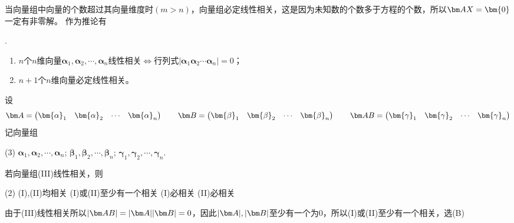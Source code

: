 当向量组中向量的个数超过其向量维度时$(m>n)$，向量组必定线性相关，这是因为未知数的个数多于方程的个数，所以$\mat{AX}=\bm{0}$一定有非零解。
作为推论有
\begin{theorem}
    .
    \begin{enumerate}[(1)]
        \item $n$个$n$维向量$\bm{\alpha}_1,\bm{\alpha}_2,\cdots,\bm{\alpha}_n$线性相关$\iff$行列式$|\bm{\alpha}_1 \bm{\alpha}_2 \cdots \bm{\alpha}_n|=0$；
        \item $n+1$个$n$维向量必定线性相关。
    \end{enumerate}
\end{theorem}
\begin{example}
    设
    \[
        \mat{A} =
        \begin{pmatrix}
            \bm{\alpha}_1 & \bm{\alpha}_2 & \cdots & \bm{\alpha}_n
        \end{pmatrix}
        \qquad
        \mat{B} =
        \begin{pmatrix}
            \bm{\beta}_1 & \bm{\beta}_2 & \cdots & \bm{\beta}_n
        \end{pmatrix}
        \qquad
        \mat{AB} =
        \begin{pmatrix}
            \bm{\gamma}_1 & \bm{\gamma}_2 & \cdots & \bm{\gamma}_n
        \end{pmatrix}
    \]
    记向量组
    \begin{tasks}[label=(\Roman*),label-width = 2em](3)
        \task $\bm{\alpha}_1,\bm{\alpha}_2,\cdots,\bm{\alpha}_n$;
        \task $\bm{\beta}_1,\bm{\beta}_2,\cdots,\bm{\beta}_n$;
        \task $\bm{\gamma}_1,\bm{\gamma}_2,\cdots,\bm{\gamma}_n$.
    \end{tasks}
    若向量组(III)线性相关，则
    \begin{tasks}[label=(\Alph*),label-width = 2em](2)
        \task (I),(II)均相关
        \task (I)或(II)至少有一个相关
        \task (I)必相关
        \task (II)必相关
    \end{tasks}
\end{example}
\begin{solution}
    由于(III)线性相关所以$|\mat{AB}|=|\mat{A}||\mat{B}|=0$，因此$|\mat{A}|,|\mat{B}|$至少有一个为$0$，所以(I)或(II)至少有一个相关，选(B)
\end{solution}

